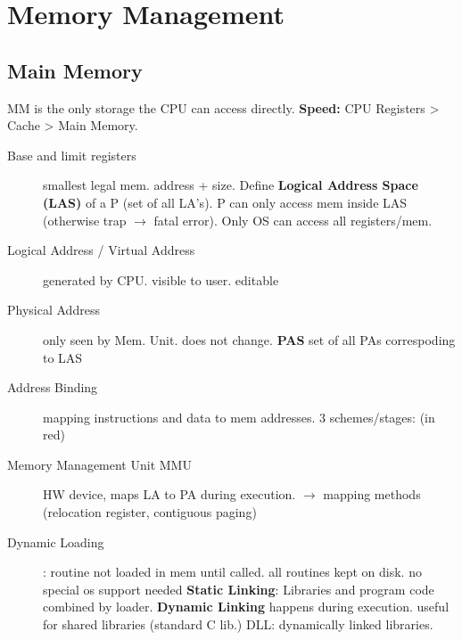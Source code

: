 \section*{Memory Management}

\subsection*{Main Memory}
MM is the only storage the CPU can access directly. \textbf{Speed:} CPU Registers > Cache > Main Memory.
\begin{description}
    \item[Base and limit registers] smallest legal mem. address + size. Define \textbf{Logical Address Space (LAS)} of a P (set of all LA's). P can only access mem inside LAS (otherwise trap $\rightarrow$ fatal error). Only OS can access all registers/mem. \\
    \item[Logical Address / Virtual Address] generated by CPU. visible to user. editable \\
    \item[Physical Address] only seen by Mem. Unit. does not change. \textbf{PAS} set of  all PAs correspoding to LAS \\
    \item[Address Binding] mapping instructions and data to mem addresses. 3 schemes/stages: (in red) \\
    \item[Memory Management Unit MMU] HW device, maps LA to PA during execution. $\rightarrow$ mapping methods (relocation register, contiguous paging) \\
    \item[Dynamic Loading]: routine not loaded in mem until called. all routines kept on disk. no special os support needed \textbf{Static Linking}: Libraries and program code combined by loader. \textbf{Dynamic Linking} happens during execution. useful for shared libraries (standard C lib.) DLL: dynamically linked libraries. \\ %
\end{description}

